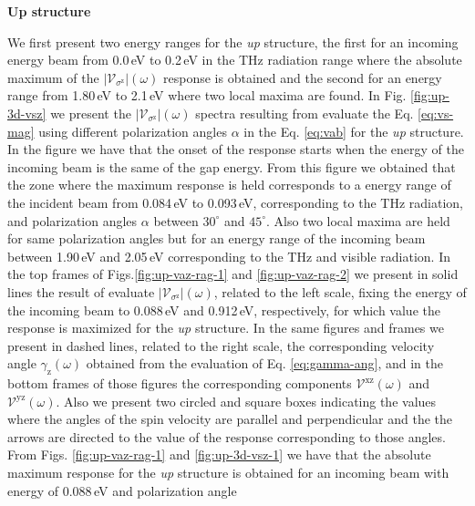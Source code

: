 \documentclass[prb,11pt,tightenlines,twocolumn,aps]{revtex4-1}
\begin{document}
\textbf{Up structure}

We first present two energy ranges for the \emph{up} structure, the first for an
incoming energy beam from 0.0\,eV to 0.2\,eV in the THz radiation range where
the absolute maximum of the $|\mathcal{V}_{\sigma^{\mathrm{z}}}|(\omega)$
response is obtained and the second for an energy range from 1.80\,eV to 2.1\,eV
where two local maxima are found.
% 
In Fig. \ref{fig:up-3d-vsz} we present the
$|\mathcal{V}_{\sigma^{\mathrm{z}}}|(\omega)$ spectra resulting from evaluate
the Eq. \eqref{eq:vs-mag} using different polarization angles $\alpha$ in the
Eq. \eqref{eq:vab} for the \emph{up} structure. In the figure we have that the
onset of the response starts when the energy of the incoming beam is the same of
the gap energy.
% 
From this figure we obtained that the zone where the maximum response is held
corresponds to a energy range of the incident beam from 0.084\,eV to 0.093\,eV,
corresponding to the THz radiation, and polarization angles $\alpha$ between
$30^{\circ}$ and $45^{\circ}$. Also two local maxima are held for same
polarization angles but for an energy range of the incoming beam between
1.90\,eV and 2.05\,eV corresponding to the THz and visible radiation.
In the top frames of Figs.\ref{fig:up-vaz-rag-1} and \ref{fig:up-vaz-rag-2} we
present in solid lines the result of evaluate
$|\mathcal{V}_{\sigma^{\mathrm{z}}}|(\omega)$, related to the left scale, fixing
the energy of the incoming beam to 0.088\,eV and 0.912\,eV, respectively, for
which value the response is maximized for the \emph{up} structure. In the same
figures and frames we present in dashed lines, related to the right scale, the
corresponding velocity angle $\gamma_{\mathrm{z}}(\omega)$ obtained from the
evaluation of Eq. \eqref{eq:gamma-ang}, and in the bottom frames of those
figures the corresponding components $\mathcal{V}^{\mathrm{xz}}(\omega)$ and
$\mathcal{V}^{\mathrm{yz}}(\omega)$. Also we present two circled and square
boxes indicating the values where the angles of the spin velocity are parallel
and perpendicular and the the arrows are directed to the value of the response
corresponding to those angles.
% 
From Figs. \ref{fig:up-vaz-rag-1} and \ref{fig:up-3d-vsz-1} we have that the
absolute maximum response for the \emph{up} structure is obtained for an
incoming beam with energy of 0.088\,eV and polarization angle
\end{document}
